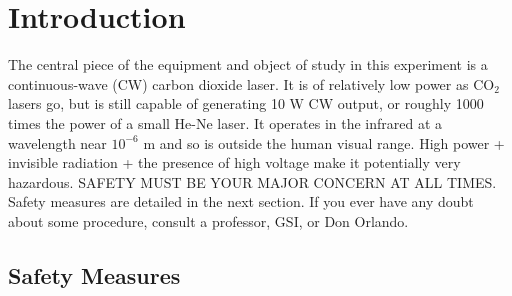 \documentclass{../lab}
\begin{document}
\section{Introduction}

The central piece of the equipment and object of study in this experiment is a continuous-wave (CW) carbon dioxide laser. It is of relatively low power as CO$_2$ lasers go, but is still capable of generating 10 W CW output, or roughly 1000 times the power of a small He-Ne laser. It operates in the infrared at a wavelength near $10^{-6}$ m and so is outside the human visual range. High power + invisible radiation + the presence of high voltage make it potentially very hazardous. SAFETY MUST BE YOUR MAJOR CONCERN AT ALL TIMES. Safety measures are detailed in the next section. If you ever have any doubt about some procedure, consult a professor, GSI, or Don Orlando.

\subsection{Safety Measures}
\end{document}
